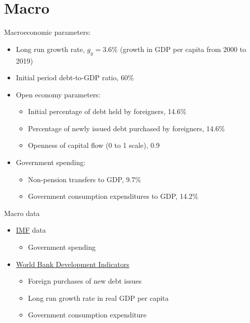 \documentclass{beamer}
\begin{document}
\section{Macro}
\begin{frame}{Macroeconomic parameters:}
\begin{itemize}
  \item Long run growth rate, $g_y= 3.6\%$ (growth in GDP per capita from 2000 to 2019)
  \item Initial period debt-to-GDP ratio, 60\%
  \item Open economy parameters:
    \begin{itemize}
      \item Initial percentage of debt held by foreigners, 14.6\%
      \item Percentage of newly issued debt purchased by foreigners, 14.6\%
      \item Openness of capital flow (0 to 1 scale), 0.9
    \end{itemize}
  \item Government spending:
    \begin{itemize}
      \item Non-pension transfers to GDP, 9.7\%
      \item Government consumption expenditures to GDP, 14.2\%
    \end{itemize}
\end{itemize}
\end{frame}

\begin{frame}{Macro data}
  \begin{itemize}
    \item \href{https://www.imf.org/external/datamapper/profile/PH}{IMF} data
      \begin{itemize}
        \item Government spending
      \end{itemize}
    \item \href{https://databank.worldbank.org/source/world-development-indicators}{World Bank Development Indicators}
      \begin{itemize}
        \item Foreign purchases of new debt issues
        \item Long run growth rate in real GDP per capita
        \item Government consumption expenditure
      \end{itemize}
  \end{itemize}
  \end{frame}
\end{document}
